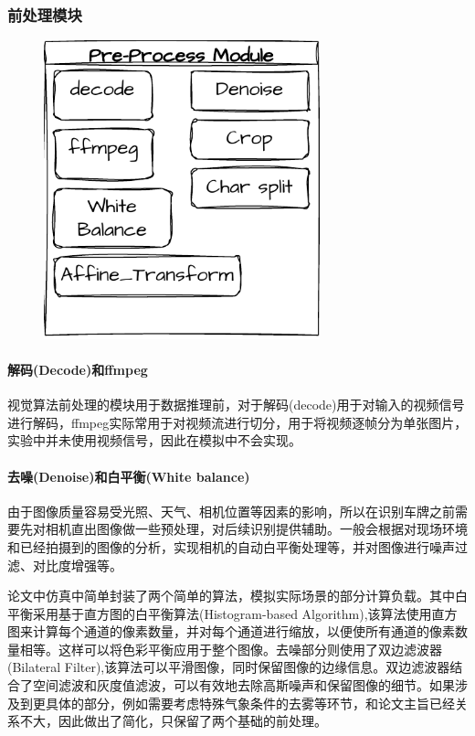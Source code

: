\documentclass[master,anonymous]{shtthesis}
\begin{document}
\subsubsection{前处理模块}
\begin{figure}[H]
	\centering
	\includegraphics[width=8cm]{img/m1.pdf}
	\label{前处理模块汇总}
\end{figure}
\paragraph{解码(Decode)和ffmpeg}
视觉算法前处理的模块用于数据推理前，对于解码(decode)用于对输入的视频信号进行解码，ffmpeg实际常用于对视频流进行切分，用于将视频逐帧分为单张图片，实验中并未使用视频信号，因此在模拟中不会实现。

\paragraph{去噪(Denoise)和白平衡(White balance)}

由于图像质量容易受光照、天气、相机位置等因素的影响，所以在识别车牌之前需要先对相机直出图像做一些预处理，对后续识别提供辅助。一般会根据对现场环境和已经拍摄到的图像的分析，实现相机的自动白平衡处理等，并对图像进行噪声过滤、对比度增强等。

论文中仿真中简单封装了两个简单的算法，模拟实际场景的部分计算负载。其中白平衡采用基于直方图的白平衡算法(Histogram-based Algorithm),该算法使用直方图来计算每个通道的像素数量，并对每个通道进行缩放，以便使所有通道的像素数量相等。这样可以将色彩平衡应用于整个图像。去噪部分则使用了双边滤波器(Bilateral Filter),该算法可以平滑图像，同时保留图像的边缘信息。双边滤波器结合了空间滤波和灰度值滤波，可以有效地去除高斯噪声和保留图像的细节。如果涉及到更具体的部分，例如需要考虑特殊气象条件的去雾等环节，和论文主旨已经关系不大，因此做出了简化，只保留了两个基础的前处理。
\end{document}
